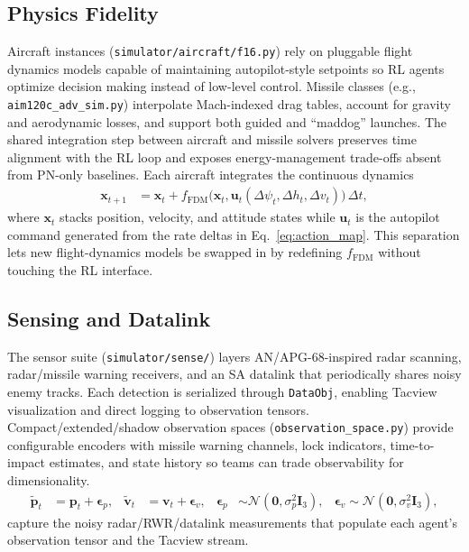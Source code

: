 \documentclass[11pt]{article}
\begin{document}
\subsection{Physics Fidelity}
Aircraft instances (\texttt{simulator/aircraft/f16.py}) rely on pluggable flight dynamics models capable of maintaining autopilot-style setpoints so RL agents optimize decision making instead of low-level control. Missile classes (e.g., \texttt{aim120c\_adv\_sim.py}) interpolate Mach-indexed drag tables, account for gravity and aerodynamic losses, and support both guided and ``maddog'' launches. The shared integration step between aircraft and missile solvers preserves time alignment with the RL loop and exposes energy-management trade-offs absent from PN-only baselines. Each aircraft integrates the continuous dynamics
\begin{align}
\mathbf{x}_{t+1} &= \mathbf{x}_{t} + f_{\text{FDM}}\big(\mathbf{x}_{t},\mathbf{u}_{t}(\Delta \psi_t,\Delta h_t,\Delta v_t)\big)\,\Delta t, \label{eq:fdm}
\end{align}
where $\mathbf{x}_t$ stacks position, velocity, and attitude states while $\mathbf{u}_t$ is the autopilot command generated from the rate deltas in Eq.~\eqref{eq:action_map}. This separation lets new flight-dynamics models be swapped in by redefining $f_{\text{FDM}}$ without touching the RL interface.

\subsection{Sensing and Datalink}
The sensor suite (\texttt{simulator/sense/}) layers AN/APG-68-inspired radar scanning, radar/missile warning receivers, and an SA datalink that periodically shares noisy enemy tracks. Each detection is serialized through \texttt{DataObj}, enabling Tacview visualization and direct logging to observation tensors. Compact/extended/shadow observation spaces (\texttt{observation\_space.py}) provide configurable encoders with missile warning channels, lock indicators, time-to-impact estimates, and state history so teams can trade observability for dimensionality.
\begin{align}
\tilde{\mathbf{p}}_{t} &= \mathbf{p}_{t} + \boldsymbol{\epsilon}_p,&
\tilde{\mathbf{v}}_{t} &= \mathbf{v}_{t} + \boldsymbol{\epsilon}_v,&
\boldsymbol{\epsilon}_p &\sim \mathcal{N}\!\left(\mathbf{0},\sigma_p^2 \mathbf{I}_3\right),&
\boldsymbol{\epsilon}_v \sim \mathcal{N}\!\left(\mathbf{0},\sigma_v^2 \mathbf{I}_3\right), \label{eq:sensing_noise}
\end{align}
capture the noisy radar/RWR/datalink measurements that populate each agent's observation tensor and the Tacview stream.
\end{document}
